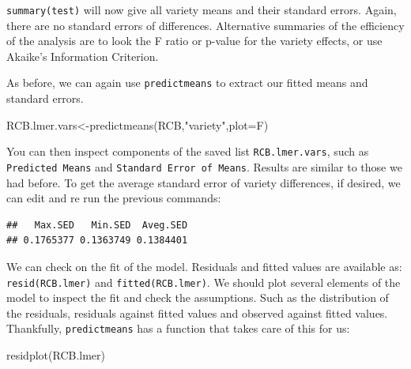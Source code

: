 \documentclass[
]{book}
\newenvironment{Shaded}{\begin{snugshade}}{\end{snugshade}}
\newcommand{\AttributeTok}[1]{\textcolor[rgb]{0.77,0.63,0.00}{#1}}
\newcommand{\FunctionTok}[1]{\textcolor[rgb]{0.00,0.00,0.00}{#1}}
\newcommand{\NormalTok}[1]{#1}
\newcommand{\OtherTok}[1]{\textcolor[rgb]{0.56,0.35,0.01}{#1}}
\newcommand{\SpecialCharTok}[1]{\textcolor[rgb]{0.00,0.00,0.00}{#1}}
\newcommand{\StringTok}[1]{\textcolor[rgb]{0.31,0.60,0.02}{#1}}
\begin{document}
\texttt{summary(test)} will now give all variety means and their standard errors. Again, there are no standard errors of differences. Alternative summaries of the efficiency of the analysis are to look the F ratio or p-value for the variety effects, or use Akaike's Information Criterion.

As before, we can again use \texttt{predictmeans} to extract our fitted means and standard errors.

\begin{Shaded}
\begin{Highlighting}[]
\NormalTok{RCB.lmer.vars}\OtherTok{\textless{}{-}}\FunctionTok{predictmeans}\NormalTok{(RCB,}\StringTok{"variety"}\NormalTok{,}\AttributeTok{plot=}\NormalTok{F)}
\end{Highlighting}
\end{Shaded}

You can then inspect components of the saved list \texttt{RCB.lmer.vars}, such as \texttt{Predicted\ Means} and \texttt{Standard\ Error\ of\ Means}. Results are similar to those we had before. To get the average standard error of variety differences, if desired, we can edit and re run the previous commands:

\begin{Shaded}
\end{Shaded}

\begin{verbatim}
##   Max.SED   Min.SED  Aveg.SED 
## 0.1765377 0.1363749 0.1384401
\end{verbatim}

We can check on the fit of the model. Residuals and fitted values are available as:
\texttt{resid(RCB.lmer)} and \texttt{fitted(RCB.lmer)}. We should plot several elements of the model to inspect the fit and check the assumptions. Such as the distribution of the residuals, residuals against fitted values and observed against fitted values. Thankfully, \texttt{predictmeans} has a function that takes care of this for us:

\begin{Shaded}
\begin{Highlighting}[]
\FunctionTok{residplot}\NormalTok{(RCB.lmer)}
\end{Highlighting}
\end{Shaded}
\end{document}
